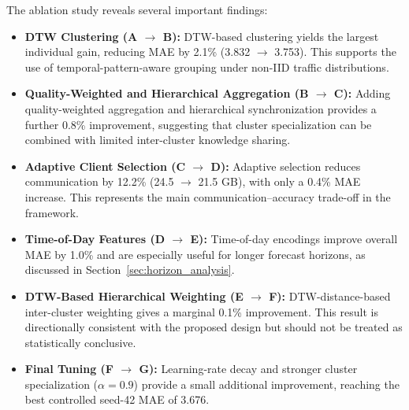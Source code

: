 The ablation study reveals several important findings:
\begin{itemize}
    \item \textbf{DTW Clustering (A $\to$ B):} DTW-based clustering yields the largest individual gain, reducing MAE by 2.1\% (3.832 $\to$ 3.753). This supports the use of temporal-pattern-aware grouping under non-IID traffic distributions.

    \item \textbf{Quality-Weighted and Hierarchical Aggregation (B $\to$ C):} Adding quality-weighted aggregation and hierarchical synchronization provides a further 0.8\% improvement, suggesting that cluster specialization can be combined with limited inter-cluster knowledge sharing.

    \item \textbf{Adaptive Client Selection (C $\to$ D):} Adaptive selection reduces communication by 12.2\% (24.5 $\to$ 21.5 GB), with only a 0.4\% MAE increase. This represents the main communication--accuracy trade-off in the framework.

    \item \textbf{Time-of-Day Features (D $\to$ E):} Time-of-day encodings improve overall MAE by 1.0\% and are especially useful for longer forecast horizons, as discussed in Section~\ref{sec:horizon_analysis}.

    \item \textbf{DTW-Based Hierarchical Weighting (E $\to$ F):} DTW-distance-based inter-cluster weighting gives a marginal 0.1\% improvement. This result is directionally consistent with the proposed design but should not be treated as statistically conclusive.

    \item \textbf{Final Tuning (F $\to$ G):} Learning-rate decay and stronger cluster specialization ($\alpha=0.9$) provide a small additional improvement, reaching the best controlled seed-42 MAE of 3.676.
\end{itemize}

